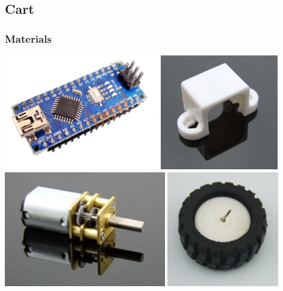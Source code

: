 
\subsection{Cart}
\subsubsection{Materials}

\begin{center}
\includegraphics[height=5cm]{picture/material/xtwduinoNano}
\includegraphics[height=5cm]{picture/material/standN20}
\includegraphics[height=5cm]{picture/material/moterN20}
\includegraphics[height=5cm]{picture/material/wheelrubber}

\end{center}

